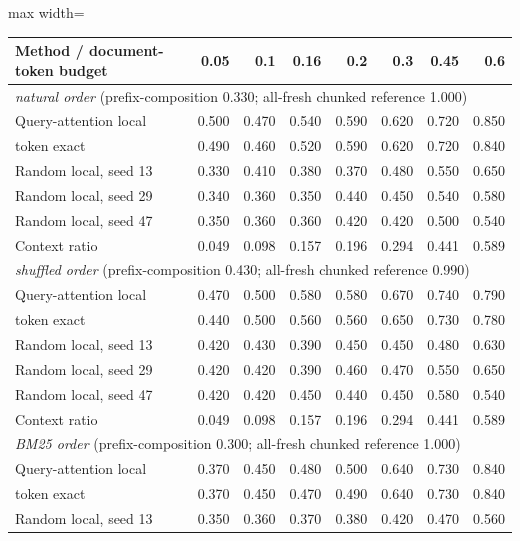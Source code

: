 \begin{table}[t]
\centering
\footnotesize
\begin{adjustbox}{max width=\textwidth}
\begin{tabular}{lrrrrrrr}
\toprule
Method / document-token budget & 0.05 & 0.1 & 0.16 & 0.2 & 0.3 & 0.45 & 0.6 \\
\midrule
\multicolumn{8}{l}{\emph{natural order} (prefix-composition 0.330; all-fresh chunked reference 1.000)} \\
Query-attention local & 0.500 & 0.470 & 0.540 & 0.590 & 0.620 & 0.720 & 0.850 \\
\quad token exact & 0.490 & 0.460 & 0.520 & 0.590 & 0.620 & 0.720 & 0.840 \\
Random local, seed 13 & 0.330 & 0.410 & 0.380 & 0.370 & 0.480 & 0.550 & 0.650 \\
Random local, seed 29 & 0.340 & 0.360 & 0.350 & 0.440 & 0.450 & 0.540 & 0.580 \\
Random local, seed 47 & 0.350 & 0.360 & 0.360 & 0.420 & 0.420 & 0.500 & 0.540 \\
Context ratio & 0.049 & 0.098 & 0.157 & 0.196 & 0.294 & 0.441 & 0.589 \\
\midrule
\multicolumn{8}{l}{\emph{shuffled order} (prefix-composition 0.430; all-fresh chunked reference 0.990)} \\
Query-attention local & 0.470 & 0.500 & 0.580 & 0.580 & 0.670 & 0.740 & 0.790 \\
\quad token exact & 0.440 & 0.500 & 0.560 & 0.560 & 0.650 & 0.730 & 0.780 \\
Random local, seed 13 & 0.420 & 0.430 & 0.390 & 0.450 & 0.450 & 0.480 & 0.630 \\
Random local, seed 29 & 0.420 & 0.420 & 0.390 & 0.460 & 0.470 & 0.550 & 0.650 \\
Random local, seed 47 & 0.420 & 0.420 & 0.450 & 0.440 & 0.450 & 0.580 & 0.540 \\
Context ratio & 0.049 & 0.098 & 0.157 & 0.196 & 0.294 & 0.441 & 0.589 \\
\midrule
\multicolumn{8}{l}{\emph{BM25 order} (prefix-composition 0.300; all-fresh chunked reference 1.000)} \\
Query-attention local & 0.370 & 0.450 & 0.480 & 0.500 & 0.640 & 0.730 & 0.840 \\
\quad token exact & 0.370 & 0.450 & 0.470 & 0.490 & 0.640 & 0.730 & 0.840 \\
Random local, seed 13 & 0.350 & 0.360 & 0.370 & 0.380 & 0.420 & 0.470 & 0.560 \\

\end{tabular}
\end{adjustbox}
\end{table}
